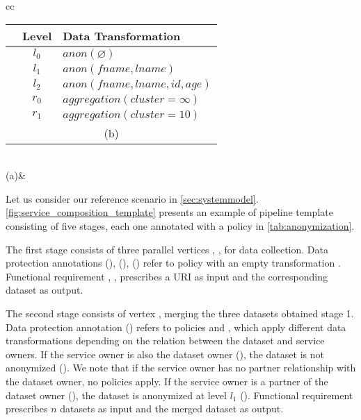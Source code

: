 \begin{table*}[ht!]
{\begin{tabular}[t]{cc}
  \begin{tabular}[t]{c|c|l}
    \textbf{\tf{i}} & \textbf{Level} & \textbf{Data Transformation}                       \\\hline
    \tp{0}          & $l_0$         & $anon(\varnothing)$                               \\
    \tp{1}          & $l_1$         & $anon(fname, lname)$                   \\
    \tp{2}          & $l_2$         & $anon(fname, lname, id, age)$  \\
    \tp{3}          & $r_0$          & $aggregation(cluster=\infty)                    $ \\
    \tp{4}          & $r_1$          & $aggregation(cluster=10)                       $  \\
    \multicolumn{3}{c}{\footnotesize (b)}
  \end{tabular}\\
  \footnotesize (a)&\\

\end{tabular}
}
\end{table*}
Let us consider our reference scenario in \cref{sec:systemmodel}. \cref{fig:service_composition_template} presents an example of pipeline template consisting of five stages, each one annotated with a policy in \cref{tab:anonymization}.

The first stage consists of three parallel vertices , ,  for data collection.
Data protection annotations \myLambda(), \myLambda(), \myLambda() refer to policy  with an empty transformation .
Functional requirement , ,   prescribes a URI as input and the corresponding dataset as output.

The second stage consists of vertex ,
merging the three datasets obtained stage 1. Data protection annotation \myLambda() refers to policies  and , which apply different data transformations depending on the relation between the dataset and service owners.
If the service owner is also the dataset owner (\pone), the dataset is not anonymized (). We note that if the service owner has no partner relationship with the dataset owner, no policies apply.
If the service owner is a partner of the dataset owner (\ptwo), the dataset is anonymized at level $l_1$ ().
Functional requirement  prescribes $n$ datasets as input and the merged dataset as output.

